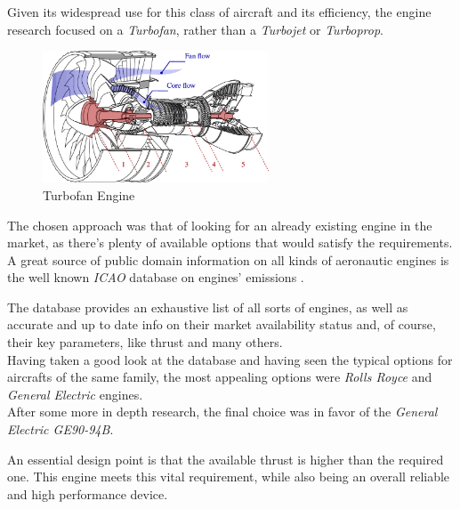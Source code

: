 \documentclass{article}
\begin{document}
Given its widespread use for this class of aircraft and its efficiency, the engine research focused on a 
\textit{Turbofan}, rather than a \textit{Turbojet} or \textit{Turboprop}. 

\begin{figure}[h!]
    \centering
    \includegraphics[width=0.6\textwidth]{Sources/Plots_and_Pictures/Turbofan-engine.png}
    \caption{Turbofan Engine \autocite{turbofan_scheme}}
    \label{turbofan}
\end{figure}

The chosen approach was that of looking for an already existing engine in the market, as there's plenty of available
options that would satisfy the requirements. \\ 

A great source of public domain information on all kinds of aeronautic engines is the well known \textit{ICAO}
database on engines' emissions \autocite{ICAO_engine_database}.

The database provides an exhaustive list of all sorts of engines, as well as accurate and up to date info on their market availability
status and, of course, their key parameters, like thrust and many others. \\ 

Having taken a good look at the database and having seen the typical options for aircrafts of the same family,
the most appealing options were \textit{Rolls Royce} and \textit{General Electric} engines. \\ 

After some more in depth research, the final choice was in favor of the \textit{General Electric GE90-94B}. 

An essential design point is that the available thrust is higher than the required one. 
This engine meets this vital requirement, while also being an overall reliable and high performance device. 


\clearpage
\end{document}
